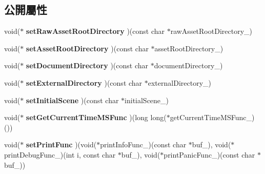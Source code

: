\subsection*{公開屬性}
\begin{DoxyCompactItemize}
\item 
void($\ast$ {\bfseries set\+Raw\+Asset\+Root\+Directory} )(const char $\ast$raw\+Asset\+Root\+Directory\+\_\+)\hypertarget{class_i_dream_sky_1_1_game_descriptor_a414f7daf2b55de2dbc0fafdd244a6916}{}\label{class_i_dream_sky_1_1_game_descriptor_a414f7daf2b55de2dbc0fafdd244a6916}

\item 
void($\ast$ {\bfseries set\+Asset\+Root\+Directory} )(const char $\ast$asset\+Root\+Directory\+\_\+)\hypertarget{class_i_dream_sky_1_1_game_descriptor_ac83153644318a406f6c7df2274cad66c}{}\label{class_i_dream_sky_1_1_game_descriptor_ac83153644318a406f6c7df2274cad66c}

\item 
void($\ast$ {\bfseries set\+Document\+Directory} )(const char $\ast$document\+Directory\+\_\+)\hypertarget{class_i_dream_sky_1_1_game_descriptor_a6485680e0930fcef7feda5d3d296b199}{}\label{class_i_dream_sky_1_1_game_descriptor_a6485680e0930fcef7feda5d3d296b199}

\item 
void($\ast$ {\bfseries set\+External\+Directory} )(const char $\ast$external\+Directory\+\_\+)\hypertarget{class_i_dream_sky_1_1_game_descriptor_a0c4d6ac2146adc28d4bbf5b6754a0178}{}\label{class_i_dream_sky_1_1_game_descriptor_a0c4d6ac2146adc28d4bbf5b6754a0178}

\item 
void($\ast$ {\bfseries set\+Initial\+Scene} )(const char $\ast$initial\+Scene\+\_\+)\hypertarget{class_i_dream_sky_1_1_game_descriptor_a579cb79027ab1eeda5a01818f98efe99}{}\label{class_i_dream_sky_1_1_game_descriptor_a579cb79027ab1eeda5a01818f98efe99}

\item 
void($\ast$ {\bfseries set\+Get\+Current\+Time\+M\+S\+Func} )(long long($\ast$get\+Current\+Time\+M\+S\+Func\+\_\+)())\hypertarget{class_i_dream_sky_1_1_game_descriptor_a5d3fb174ce60d54bc882745f505d2b1a}{}\label{class_i_dream_sky_1_1_game_descriptor_a5d3fb174ce60d54bc882745f505d2b1a}

\item 
void($\ast$ {\bfseries set\+Print\+Func} )(void($\ast$print\+Info\+Func\+\_\+)(const char $\ast$buf\+\_\+), void($\ast$print\+Debug\+Func\+\_\+)(int i, const char $\ast$buf\+\_\+), void($\ast$print\+Panic\+Func\+\_\+)(const char $\ast$buf\+\_\+))\hypertarget{class_i_dream_sky_1_1_game_descriptor_aa234960183d64089937c39ba67311dfb}{}\label{class_i_dream_sky_1_1_game_descriptor_aa234960183d64089937c39ba67311dfb}


\end{DoxyCompactItemize}
